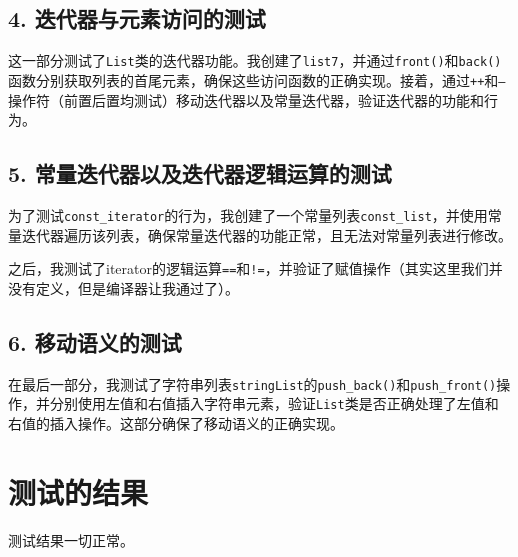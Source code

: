 \documentclass[UTF8]{ctexart}
\begin{document}
\subsection*{4. 迭代器与元素访问的测试}
这一部分测试了\texttt{List}类的迭代器功能。我创建了\texttt{list7}，并通过\texttt{front()}和\texttt{back()}函数分别获取列表的首尾元素，确保这些访问函数的正确实现。接着，通过\texttt{++}和\texttt{--}操作符（前置后置均测试）移动迭代器以及常量迭代器，验证迭代器的功能和行为。

\subsection*{5. 常量迭代器以及迭代器逻辑运算的测试}
为了测试\texttt{const\_iterator}的行为，我创建了一个常量列表\texttt{const\_list}，并使用常量迭代器遍历该列表，确保常量迭代器的功能正常，且无法对常量列表进行修改。

之后，我测试了iterator的逻辑运算\texttt{==}和\texttt{!=}，并验证了赋值操作（其实这里我们并没有定义，但是编译器让我通过了）。

\subsection*{6. 移动语义的测试}
在最后一部分，我测试了字符串列表\texttt{stringList}的\texttt{push\_back()}和\texttt{push\_front()}操作，并分别使用左值和右值插入字符串元素，验证\texttt{List}类是否正确处理了左值和右值的插入操作。这部分确保了移动语义的正确实现。

\section{测试的结果}

测试结果一切正常。
\end{document}
